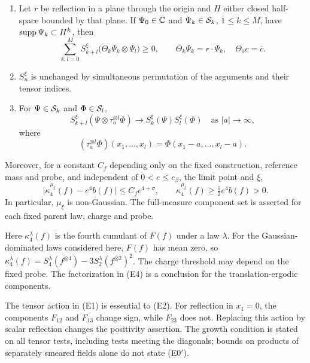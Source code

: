 \begin{theorem}
\begin{enumerate}
\item[\textup{(E2)}] Let $r$ be reflection in a plane through the origin
and $H$ either closed half-space bounded by that plane.
If $\Psi_0\in\mathbb C$ and $\Psi_k\in\mathcal S_k$, $1\le k\le M$,
have $\operatorname{supp}\Psi_k\subset H^k$, then
\begin{equation}\label{eq:main-rp}
 \sum_{k,l=0}^M S_{k+l}^\xi
 \bigl(\Theta_k\Psi_k\otimes\Psi_l\bigr)\ge0,
 \qquad \Theta_k\Psi_k=\overline{r\cdot\Psi_k},\quad
 \Theta_0c=\overline c.
\end{equation}
\item[\textup{(E3)}] $S_n^\xi$ is unchanged by simultaneous permutation
of the arguments and their tensor indices.
\item[\textup{(E4)}] For $\Psi\in\mathcal S_k$ and $\Phi\in\mathcal S_l$,
\begin{equation}\label{eq:main-cluster}
 S_{k+l}^\xi(\Psi\otimes\tau_a^{\otimes l}\Phi)
 \longrightarrow S_k^\xi(\Psi)S_l^\xi(\Phi)
 \quad\text{as }|a|\longrightarrow\infty,
\end{equation}
where
\[
 (\tau_a^{\otimes l}\Phi)(x_1,\ldots,x_l)
 =\Phi(x_1-a,\ldots,x_l-a).
\]
\end{enumerate}
Moreover, for a constant $C_f$ depending only on the fixed
construction, reference mass and probe, and independent of
$0<e\le e_\beta$, the limit point and $\xi$,
\begin{equation}\label{eq:main-cumulant}
 \bigl|\kappa_4^{\mu_\xi}(f)-e^4b(f)\bigr|
 \le C_f e^{4+\sigma},\qquad
 \kappa_4^{\mu_\xi}(f)\ge\tfrac12e^4b(f)>0.
\end{equation}
In particular, $\mu_\xi$ is non-Gaussian.
The full-measure component set is asserted for each fixed parent
law, charge and probe.
\end{theorem}

Here $\kappa_4^\lambda(f)$ is the fourth cumulant of $F(f)$ under a
law $\lambda$. For the Gaussian-dominated laws considered here,
$F(f)$ has mean zero, so
$\kappa_4^\lambda(f)=S_4^\lambda(f^{\otimes4})
-3S_2^\lambda(f^{\otimes2})^2$.
The charge threshold may depend on the fixed probe.
The factorization in \textup{(E4)} is a conclusion for the
translation-ergodic components.

The tensor action in \textup{(E1)} is essential to
\textup{(E2)}. For reflection in $x_1=0$, the components $F_{12}$ and
$F_{13}$ change sign, while $F_{23}$ does not. Replacing this action
by scalar reflection changes the positivity assertion.
The growth condition is stated on all tensor tests, including tests
meeting the diagonals; bounds on products of separately smeared fields
alone do not state \textup{(E0$'$)}.



